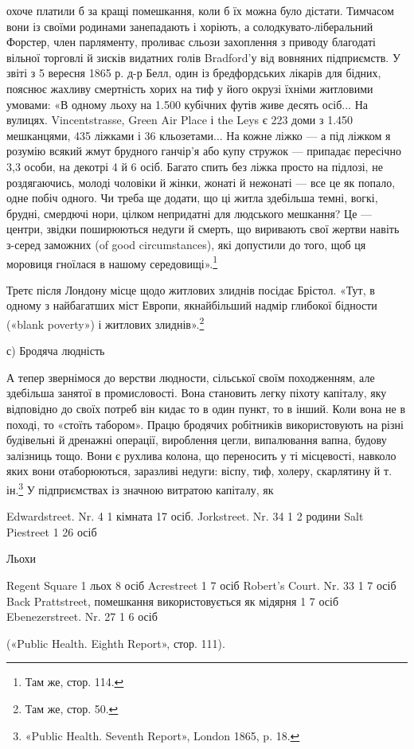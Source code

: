 охоче платили б за кращі помешкання, коли б їх можна було
дістати. Тимчасом вони із своїми родинами занепадають і хоріють,
а солодкувато-ліберальний Форстер, член парляменту, проливає
сльози захоплення з приводу благодаті вільної торговлі й зисків
видатних голів Bradford’у від вовняних підприємств. У звіті
з 5 вересня 1865 р. д-р Белл, один із бредфордських лікарів для
бідних, пояснює жахливу смертність хорих на тиф у його окрузі
їхніми житловими умовами: «В одному льоху на 1.500 кубічних
футів живе десять осіб... На вулицях. Vincentstrasse, Green
Air Place і the Leys є 223 доми з 1.450 мешканцями, 435 ліжками
і 36 кльозетами... На кожне ліжко — а під ліжком я розумію
всякий жмут брудного ганчір’я або купу стружок — припадає
пересічно 3,3 особи, на декотрі 4 й 6 осіб. Багато спить без ліжка
просто на підлозі, не роздягаючись, молоді чоловіки й жінки,
жонаті й нежонаті — все це як попало, одне побіч одного. Чи
треба ще додати, що ці житла здебільша темні, вогкі, брудні,
смердючі нори, цілком непридатні для людського мешкання?
Це — центри, звідки поширюються недуги й смерть, що виривають
свої жертви навіть з-серед заможних (of good circumstances),
які допустили до того, щоб ця моровиця гноїлася в нашому
середовищі».\footnote{
Там же, стор. 114.
}

Третє після Лондону місце щодо житлових злиднів посідає
Брістол. «Тут, в одному з найбагатших міст Европи, якнайбільший
надмір глибокої бідности («blank poverty») і житлових
злиднів».\footnote{
Там же, стор. 50.
}

с) Бродяча людність

А тепер звернімося до верстви людности, сільської своїм походженням,
але здебільша занятої в промисловості. Вона становить
легку піхоту капіталу, яку відповідно до своїх потреб
він кидає то в один пункт, то в інший. Коли вона не в поході,
то «стоїть табором». Працю бродячих робітників використовують
на різні будівельні й дренажні операції, вироблення цегли,
випалювання вапна, будову залізниць тощо. Вони є рухлива
колона, що переносить у ті місцевості, навколо яких вони отаборюються,
заразливі недуги: віспу, тиф, холеру, скарлятину
й т. ін.\footnote{
«Public Health. Seventh Report», London 1865, p. 18.
} У підприємствах із значною витратою капіталу, як

Edwardstreet. Nr. 4        1    кімната    17 осіб.
Jorkstreet. Nr. 34        1        2 родини
Salt Piestreet      1  26 осіб

Льохи

Regent Square        1    льох    8 осіб
Acrestreet        1        7 осіб
Robert’s Court. Nr. 33    1     7 осіб
Back Prattstreet, помешкання
використовується як мідярня    1         7 осіб
Ebenezerstreet. Nr. 27           1            6 осіб

(«Public Health. Eighth Report», стор. 111).